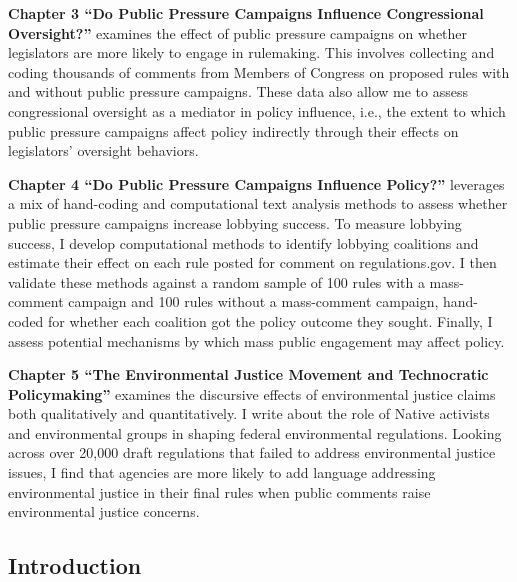 \documentclass[
      12pt,
        ]{article}
\begin{document}
\textbf{Chapter 3 ``Do Public Pressure Campaigns Influence Congressional Oversight?''} examines the effect of public pressure campaigns on whether legislators are more likely to engage in rulemaking. This involves collecting and coding thousands of comments from Members of Congress on proposed rules with and without public pressure campaigns. These data also allow me to assess congressional oversight as a mediator in policy influence, i.e., the extent to which public pressure campaigns affect policy indirectly through their effects on legislators' oversight behaviors.

\textbf{Chapter 4 ``Do Public Pressure Campaigns Influence Policy?''} leverages a mix of hand-coding and computational text analysis methods to assess whether public pressure campaigns increase lobbying success. To measure lobbying success, I develop computational methods to identify lobbying coalitions and estimate their effect on each rule posted for comment on regulations.gov. I then validate these methods against a random sample of 100 rules with a mass-comment campaign and 100 rules without a mass-comment campaign, hand-coded for whether each coalition got the policy outcome they sought. Finally, I assess potential mechanisms by which mass public engagement may affect policy.

\textbf{Chapter 5 ``The Environmental Justice Movement and Technocratic Policymaking''} examines the discursive effects of environmental justice claims both qualitatively and quantitatively. I write about the role of Native activists and environmental groups in shaping federal environmental regulations. Looking across over 20,000 draft regulations that failed to address environmental justice issues, I find that agencies are more likely to add language addressing environmental justice in their final rules when public comments raise environmental justice concerns.

\newpage

\onehalfspacing

\setcounter{page}{1}

\hypertarget{introduction}{%
\subsection{Introduction}\label{introduction}}
\end{document}
